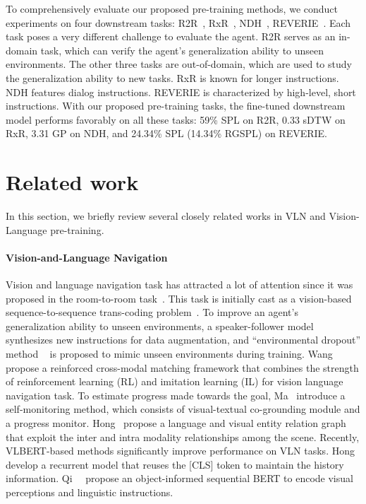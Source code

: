 \documentclass[10pt,twocolumn,letterpaper]{article}
\begin{document}
To comprehensively evaluate our proposed pre-training methods, we conduct experiments on four downstream tasks:  R2R~\cite{r2r}, RxR~\cite{rxr}, NDH~\cite{ndh}, REVERIE~\cite{reverie}. Each task poses a very different challenge to evaluate the agent. R2R serves as an in-domain task, which can verify the agent's generalization ability to unseen environments. The other three tasks are out-of-domain, which are used to study the generalization ability to new tasks. RxR is known for longer instructions. NDH features dialog instructions. REVERIE is characterized by high-level, short instructions. With our proposed pre-training tasks, the fine-tuned downstream model performs favorably on all these tasks: 59\% SPL on R2R,  0.33 sDTW on RxR, 3.31 GP on NDH, and 24.34\% SPL (14.34\% RGSPL) on REVERIE. \section{Related work}
\label{sec:related_work}
In this section, we briefly review several closely related works in VLN and Vision-Language pre-training.

\vspace{-7pt}
\paragraph{Vision-and-Language Navigation}
Vision and language navigation task has attracted a lot of attention since it was proposed in the room-to-room task~\cite{r2r}. 
This task is initially cast as a vision-based sequence-to-sequence trans-coding problem~\cite{r2r}.
To improve an agent's generalization ability to unseen environments, a speaker-follower model~\cite{speakerfollower} synthesizes new instructions for data augmentation, and ``environmental dropout'' method ~\cite{envdrop} is proposed to mimic unseen environments during training.
Wang~\etal~\cite{rcm} propose a reinforced cross-modal matching framework that combines the strength of reinforcement learning (RL) and imitation learning (IL) for vision language navigation task.
To estimate progress made towards the goal, Ma~\etal\cite{selfmonitor} introduce a self-monitoring method, which consists of visual-textual co-grounding module and a progress monitor. 
Hong~\etal\cite{graph} propose a language and visual entity relation graph that exploit the inter and intra modality relationships among the scene. 
Recently, VLBERT-based methods significantly improve performance on VLN tasks. Hong~\etal\cite{recurrent} develop a recurrent model that reuses the [CLS] token to maintain the history information. Qi~\etal~\cite{orist} propose an object-informed sequential BERT to encode visual perceptions and linguistic instructions.
\end{document}
